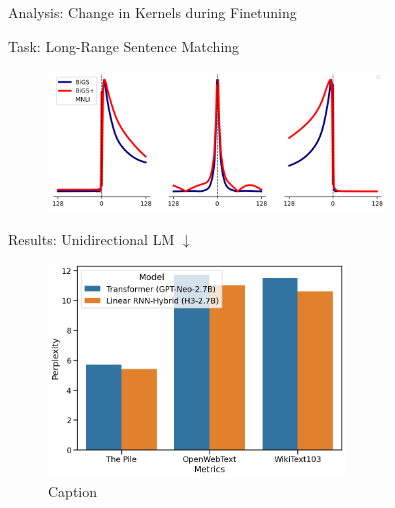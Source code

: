 \begin{frame}{Analysis: Change in Kernels during Finetuning }

\centerline{Task: Long-Range Sentence Matching}
\begin{figure}
    \centering
\includegraphics[width=0.8\textwidth]{Figs/comparison_results.png}
    \end{figure}
\end{frame}



\begin{frame}{Results: Unidirectional LM \cite{dao2022hungry}  $\downarrow$}
        \begin{figure}
        \centering
        \includegraphics[width=0.7\textwidth]{Figs/H3.png}
        \caption{Caption}
        \label{fig:my_label}
    \end{figure}
\end{frame}



